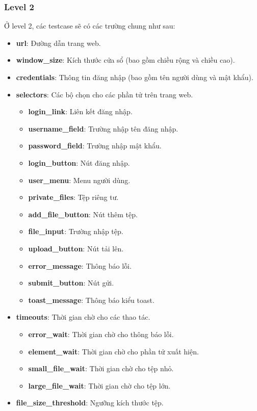 \subsubsection{Level 2}
Ở level 2, các testcase sẽ có các trường chung như sau:
\begin{itemize}
    \item \textbf{url}: Đường dẫn trang web.
    \item \textbf{window\_size}: Kích thước cửa sổ (bao gồm chiều rộng và chiều cao).
    \item \textbf{credentials}: Thông tin đăng nhập (bao gồm tên người dùng và mật khẩu).
    \item \textbf{selectors}: Các bộ chọn cho các phần tử trên trang web.
    \begin{itemize}
        \item \textbf{login\_link}: Liên kết đăng nhập.
        \item \textbf{username\_field}: Trường nhập tên đăng nhập.
        \item \textbf{password\_field}: Trường nhập mật khẩu.
        \item \textbf{login\_button}: Nút đăng nhập.
        \item \textbf{user\_menu}: Menu người dùng.
        \item \textbf{private\_files}: Tệp riêng tư.
        \item \textbf{add\_file\_button}: Nút thêm tệp.
        \item \textbf{file\_input}: Trường nhập tệp.
        \item \textbf{upload\_button}: Nút tải lên.
        \item \textbf{error\_message}: Thông báo lỗi.
        \item \textbf{submit\_button}: Nút gửi.
        \item \textbf{toast\_message}: Thông báo kiểu toast.
    \end{itemize}
    \item \textbf{timeouts}: Thời gian chờ cho các thao tác.
    \begin{itemize}
        \item \textbf{error\_wait}: Thời gian chờ cho thông báo lỗi.
        \item \textbf{element\_wait}: Thời gian chờ cho phần tử xuất hiện.
        \item \textbf{small\_file\_wait}: Thời gian chờ cho tệp nhỏ.
        \item \textbf{large\_file\_wait}: Thời gian chờ cho tệp lớn.
    \end{itemize}
    \item \textbf{file\_size\_threshold}: Ngưỡng kích thước tệp.
\end{itemize}

